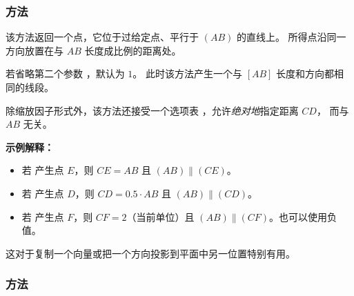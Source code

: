 \subsubsection{方法 } %
\label{ssub:method_line_collinear__at}

该方法返回一个点，它位于过给定点、平行于 $(AB)$ 的直线上。
所得点沿同一方向放置在与 $AB$ 长度成比例的距离处。

\medskip

若省略第二个参数 ，默认为 $1$。
此时该方法产生一个与 $[AB]$ 长度和方向都相同的线段。

\medskip

除缩放因子形式外，该方法还接受一个选项表
，允许\emph{绝对地}指定距离 $CD$，
而与 $AB$ 无关。

\medskip

\textbf{示例解释：}
\begin{itemize}
  \item 若  产生点 $E$，则 $CE = AB$ 且 $(AB) \parallel (CE)$。
  \item 若  产生点 $D$，则 $CD = 0.5 \cdot AB$ 且 $(AB) \parallel (CD)$。
  \item 若  产生点 $F$，则 $CF = 2$（当前单位）且 $(AB) \parallel (CF)$。也可以使用负值。
\end{itemize}

这对于复制一个向量或把一个方向投影到平面中另一位置特别有用。

\vspace{1em}
\begin{tkzexample}[latex =.5\textwidth]
\begin{center}
\end{center}
\end{tkzexample}


\subsubsection{方法 } %
\label{ssub:method_line_orthogonal__at}

